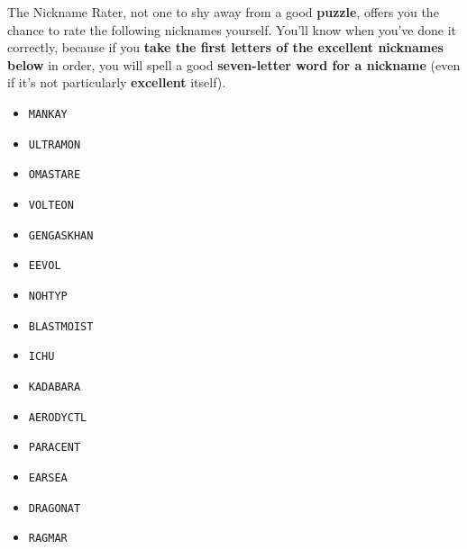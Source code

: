 The Nickname Rater, not one to shy away from a good \textbf{puzzle}, offers you
the chance to rate the following \mappMobidot{} nicknames yourself.  You'll know
when you've done it correctly, because if you \textbf{take the first letters of
the excellent nicknames below} in order, you will spell a good
\textbf{seven-letter word for a nickname}
(even if it's not particularly \textbf{excellent} itself).


\begin{multicols}{3}
  \begin{itemize}
    \item \texttt{MANKAY} %
    \item \texttt{ULTRAMON} %
    \item \texttt{OMASTARE} %
    \item \texttt{VOLTEON} %
    \item \texttt{GENGASKHAN} %
    \item \texttt{EEVOL} %
    \item \texttt{NOHTYP} %
    \item \texttt{BLASTMOIST} %
    \item \texttt{ICHU} %
    \item \texttt{KADABARA} %
    \item \texttt{AERODYCTL} %
    \item \texttt{PARACENT} %
    \item \texttt{EARSEA} %
    \item \texttt{DRAGONAT} %
    \item \texttt{RAGMAR} %
  \end{itemize}
\end{multicols}

